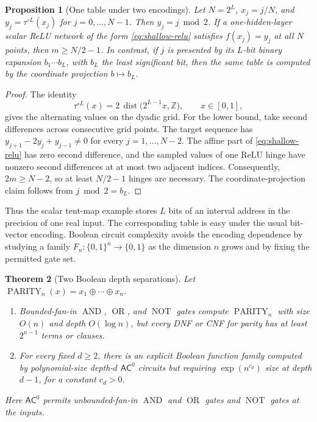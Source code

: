 \documentclass[11pt,twoside]{article}
\newcommand{\NOT}{\operatorname{NOT}}
\newcommand{\AND}{\operatorname{AND}}
\newcommand{\OR}{\operatorname{OR}}
\newtheorem{theorem}{Theorem}[section]
\newtheorem{proposition}[theorem]{Proposition}
\theoremstyle{definition}
\theoremstyle{remark}
\begin{document}
\begin{proposition}[One table under two encodings]
\label{prop:tent-boolean-grid}
Let $N=2^L$, $x_j=j/N$, and
$y_j=\tau^{\circ L}(x_j)$ for $j=0,\ldots,N-1$. Then
$y_j=j\bmod 2$. If a one-hidden-layer scalar ReLU network of the form
\eqref{eq:shallow-relu} satisfies $f(x_j)=y_j$ at all $N$ points, then
$m\geq N/2-1$. In contrast, if $j$ is presented by its $L$-bit binary
expansion $b_1\cdots b_L$, with $b_L$ the least significant bit, then the
same table is computed by the coordinate projection $b\mapsto b_L$.
\end{proposition}

\begin{proof}
The identity
\[
 \tau^{\circ L}(x)=2\,\operatorname{dist}
       \bigl(2^{L-1}x,\mathbb Z\bigr),\qquad x\in[0,1],
\]
gives the alternating values on the dyadic grid. For the lower bound, take
second differences across consecutive grid points. The target sequence has
$y_{j+1}-2y_j+y_{j-1}\neq0$ for every $j=1,\ldots,N-2$. The affine part of
\eqref{eq:shallow-relu} has zero second difference, and the sampled values of
one ReLU hinge have nonzero second differences at at most two adjacent
indices. Consequently, $2m\geq N-2$, so at least $N/2-1$ hinges are
necessary. The coordinate-projection claim follows from $j\bmod2=b_L$.
\end{proof}

Thus the scalar tent-map example stores $L$ bits of an interval address in
the precision of one real input. The corresponding table is easy under the
usual bit-vector encoding. Boolean circuit complexity avoids the encoding
dependence by studying a family $F_n:\{0,1\}^n\to\{0,1\}$ as the dimension $n$ grows
and by fixing the permitted gate set.

\begin{theorem}[Two Boolean depth separations]
\label{thm:boolean-depth-separations}
Let
$\operatorname{PARITY}_n(x)=x_1\oplus\cdots\oplus x_n$.
\begin{enumerate}[label=(\alph*),leftmargin=*]
\item Bounded-fan-in $\AND$, $\OR$, and $\NOT$ gates compute
$\operatorname{PARITY}_n$ with size $O(n)$ and depth $O(\log n)$, but every
DNF or CNF for parity has at least $2^{n-1}$ terms or clauses.
\item For every fixed $d\geq2$, there is an explicit Boolean function family
computed by polynomial-size depth-$d$ $\mathsf{AC}^0$ circuits but requiring
$\exp(n^{c_d})$ size at depth $d-1$, for a constant $c_d>0$.
\end{enumerate}
Here $\mathsf{AC}^0$ permits unbounded-fan-in $\AND$ and $\OR$ gates and
$\NOT$ gates at the inputs.
\end{theorem}
\end{document}
